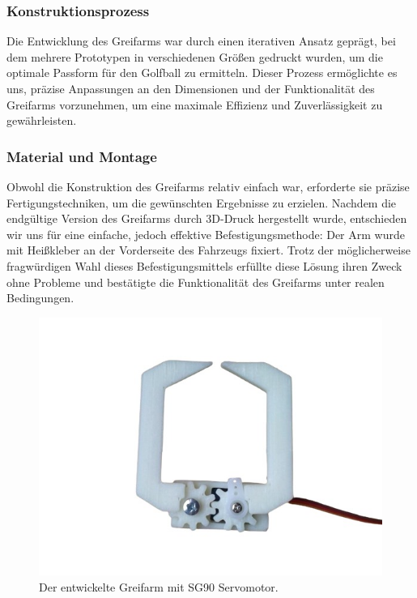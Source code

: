\subsubsection{Konstruktionsprozess}
Die Entwicklung des Greifarms war durch einen iterativen Ansatz geprägt, bei dem mehrere Prototypen in verschiedenen Größen gedruckt wurden, um die optimale Passform für den Golfball zu ermitteln. Dieser Prozess ermöglichte es uns, präzise Anpassungen an den Dimensionen und der Funktionalität des Greifarms vorzunehmen, um eine maximale Effizienz und Zuverlässigkeit zu gewährleisten.

\subsubsection{Material und Montage}
Obwohl die Konstruktion des Greifarms relativ einfach war, erforderte sie präzise Fertigungstechniken, um die gewünschten Ergebnisse zu erzielen. Nachdem die endgültige Version des Greifarms durch 3D-Druck hergestellt wurde, entschieden wir uns für eine einfache, jedoch effektive Befestigungsmethode: Der Arm wurde mit Heißkleber an der Vorderseite des Fahrzeugs fixiert. Trotz der möglicherweise fragwürdigen Wahl dieses Befestigungsmittels erfüllte diese Lösung ihren Zweck ohne Probleme und bestätigte die Funktionalität des Greifarms unter realen Bedingungen.

\begin{figure}[H]
\centering
\includegraphics[width=1\textwidth]{Resources/claw_gripper.jpg}
\caption{Der entwickelte Greifarm mit SG90 Servomotor.}
\end{figure}

